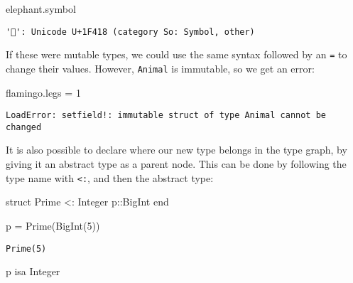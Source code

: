 \documentclass[
  letterpaper,
  DIV=11,
  numbers=noendperiod]{scrreprt}
\newenvironment{Shaded}{\begin{snugshade}}{\end{snugshade}}
\newcommand{\DataTypeTok}[1]{\textcolor[rgb]{0.68,0.00,0.00}{#1}}
\newcommand{\FloatTok}[1]{\textcolor[rgb]{0.68,0.00,0.00}{#1}}
\newcommand{\FunctionTok}[1]{\textcolor[rgb]{0.28,0.35,0.67}{#1}}
\newcommand{\KeywordTok}[1]{\textcolor[rgb]{0.00,0.23,0.31}{#1}}
\newcommand{\NormalTok}[1]{\textcolor[rgb]{0.00,0.23,0.31}{#1}}
\newcommand{\OperatorTok}[1]{\textcolor[rgb]{0.37,0.37,0.37}{#1}}
\begin{document}
\begin{Shaded}
\begin{Highlighting}[]
\NormalTok{elephant.symbol}
\end{Highlighting}
\end{Shaded}

\begin{verbatim}
'🐘': Unicode U+1F418 (category So: Symbol, other)
\end{verbatim}

If these were mutable types, we could use the same syntax followed by an
\texttt{=} to change their values. However, \texttt{Animal} is
immutable, so we get an error:

\begin{Shaded}
\begin{Highlighting}[]
\NormalTok{flamingo.legs }\OperatorTok{=} \FloatTok{1}
\end{Highlighting}
\end{Shaded}

\begin{verbatim}
LoadError: setfield!: immutable struct of type Animal cannot be changed
\end{verbatim}

It is also possible to declare where our new type belongs in the type
graph, by giving it an abstract type as a parent node. This can be done
by following the type name with \texttt{\textless{}:}, and then the
abstract type:

\begin{Shaded}
\begin{Highlighting}[]
\KeywordTok{struct}\NormalTok{ Prime }\OperatorTok{\textless{}:}\DataTypeTok{ Integer}
\NormalTok{    p}\OperatorTok{::}\DataTypeTok{BigInt}
\KeywordTok{end}
\end{Highlighting}
\end{Shaded}

\begin{Shaded}
\begin{Highlighting}[]
\NormalTok{p }\OperatorTok{=} \FunctionTok{Prime}\NormalTok{(}\FunctionTok{BigInt}\NormalTok{(}\FloatTok{5}\NormalTok{))}
\end{Highlighting}
\end{Shaded}

\begin{verbatim}
Prime(5)
\end{verbatim}

\begin{Shaded}
\begin{Highlighting}[]
\NormalTok{p isa }\DataTypeTok{Integer}
\end{Highlighting}
\end{Shaded}
\end{document}
